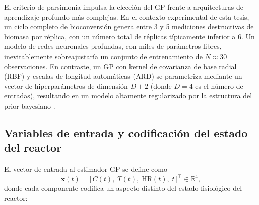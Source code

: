 El criterio de parsimonia impulsa la elección del GP frente a arquitecturas de aprendizaje profundo más complejas. En el contexto experimental de esta tesis, un ciclo completo de bioconversión genera entre \num{3} y \num{5} mediciones destructivas de biomasa por réplica, con un número total de réplicas típicamente inferior a \num{6}. Un modelo de redes neuronales profundas, con miles de parámetros libres, inevitablemente sobreajustaría un conjunto de entrenamiento de $N \approx \num{30}$ observaciones. En contraste, un GP con kernel de covarianza de base radial (RBF) y escalas de longitud automáticas (ARD) se parametriza mediante un vector de hiperparámetros de dimensión $D+2$ (donde $D=4$ es el número de entradas), resultando en un modelo altamente regularizado por la estructura del prior bayesiano \parencite{adadiPeekingBlackBoxSurvey2018, biagiDevelopmentMachineLearningbased2024}.

\subsection{Variables de entrada y codificación del estado del reactor}
\label{subsec:cap4_gp_variables}

El vector de entrada al estimador GP se define como
\begin{equation}
    \label{eq:cap4_vector_entrada}
    \mathbf{x}(t) = \bigl[\, C(t),\; T(t),\; \mathrm{HR}(t),\; t \,\bigr]^\intercal \in \mathbb{R}^4,
\end{equation}
donde cada componente codifica un aspecto distinto del estado fisiológico del reactor:


